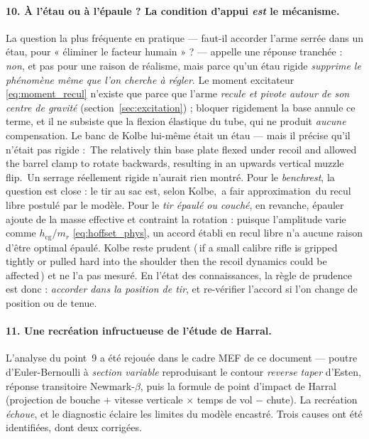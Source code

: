 \documentclass[12pt,a4paper]{article}
\begin{document}
	\paragraph{10. À l'étau ou à l'épaule ? La condition d'appui \emph{est} le mécanisme.} La question la plus fréquente en pratique — faut-il accorder l'arme serrée dans un étau, pour « éliminer le facteur humain » ? — appelle une réponse tranchée : \emph{non}, et pas pour une raison de réalisme, mais parce qu'un étau rigide \emph{supprime le phénomène même que l'on cherche à régler}. Le moment excitateur \eqref{eq:moment_recul} n'existe que parce que l'arme \emph{recule et pivote autour de son centre de gravité} (section~\ref{sec:excitation}) ; bloquer rigidement la base annule ce terme, et il ne subsiste que la flexion élastique du tube, qui ne produit \emph{aucune} compensation. Le banc de Kolbe lui-même était un étau — mais il précise qu'il n'était pas rigide : \og\,The relatively thin base plate flexed under recoil and allowed the barrel clamp to rotate backwards, resulting in an upwards vertical muzzle flip.\,\fg{} Un serrage réellement rigide n'aurait rien montré. Pour le \emph{benchrest}, la question est close : le tir au sac est, selon Kolbe, \og\,a fair approximation\,\fg{} du recul libre postulé par le modèle. Pour le \emph{tir épaulé ou couché}, en revanche, épauler ajoute de la masse effective et contraint la rotation : puisque l'amplitude varie comme $h_\text{cg}/m_r$ \eqref{eq:hoffset_phys}, un accord établi en recul libre n'a aucune raison d'être optimal épaulé. Kolbe reste prudent (\og\,if a small calibre rifle is gripped tightly or pulled hard into the shoulder then the recoil dynamics could be affected\,\fg{}) et ne l'a pas mesuré. En l'état des connaissances, la règle de prudence est donc : \emph{accorder dans la position de tir}, et re-vérifier l'accord si l'on change de position ou de tenue.

	\paragraph{11. Une recréation infructueuse de l'étude de Harral.} L'analyse du point~9 a été rejouée dans le cadre MEF de ce document --- poutre d'Euler-Bernoulli à \emph{section variable} reproduisant le contour \emph{reverse taper} d'Esten, réponse transitoire Newmark-$\beta$, puis la formule de point d'impact de Harral (projection de bouche $+$ vitesse verticale $\times$ temps de vol $-$ chute). La recréation \emph{échoue}, et le diagnostic éclaire les limites du modèle encastré. Trois causes ont été identifiées, dont deux corrigées.
\end{document}
